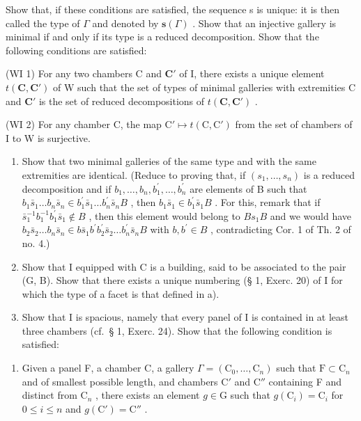 Show that, if these conditions are satisfied, the sequence s is unique: it is then called the type of \(\Gamma\) and denoted by \(\mathbf{s}(\Gamma)\) . Show that an injective gallery is minimal if and only if its type is a reduced decomposition. Show that the following conditions are satisfied:

(WI 1) For any two chambers C and \(\mathbf{C}'\) of I, there exists a unique element \(t(\mathbf{C},\mathbf{C}')\) of W such that the set of types of minimal galleries with extremities C and \(\mathbf{C}'\) is the set of reduced decompositions of \(t(\mathbf{C},\mathbf{C}')\) .

(WI 2) For any chamber C, the map \(\mathrm{C}' \mapsto t(\mathrm{C}, \mathrm{C}')\) from the set of chambers of I to W is surjective.

\begin{enumerate}
\def\labelenumi{\alph{enumi})}
\setcounter{enumi}{4}
\item
  Show that two minimal galleries of the same type and with the same extremities are identical. (Reduce to proving that, if \((s_{1},\ldots,s_{n})\) is a reduced decomposition and if \(b_{1},\ldots,b_{n},b_{1}^{\prime},\ldots,b_{n}^{\prime}\) are elements of B such that \(b_{1}\bar{s}_{1}\ldots b_{n}\bar{s}_{n}\in b_{1}^{\prime}\bar{s}_{1}\ldots b_{n}^{\prime}\bar{s}_{n}B\) , then \(b_{1}\bar{s}_{1}\in b_{1}^{\prime}\bar{s}_{1}B\) . For this, remark that if \(\bar{s}_{1}^{-1}b_{1}^{-1}b_{1}^{\prime}\bar{s}_{1}\notin B\) , then this element would belong to \(Bs_{1}B\) and we would have \(b_{2}\bar{s}_{2}\ldots b_{n}\bar{s}_{n}\in b\bar{s}_{1}b^{\prime}b_{2}^{\prime}\bar{s}_{2}\ldots b_{n}^{\prime}\bar{s}_{n}B\) with \(b,b^{\prime}\in B\) , contradicting Cor. 1 of Th. 2 of no. 4.)
\item
  Show that I equipped with C is a building, said to be associated to the pair (G, B). Show that there exists a unique numbering (§ 1, Exerc. 20) of I for which the type of a facet is that defined in a).
\item
  Show that I is spacious, namely that every panel of I is contained in at least three chambers (cf.~§ 1, Exerc. 24). Show that the following condition is satisfied:
\end{enumerate}

\begin{enumerate}
\def\labelenumi{(\Alph{enumi})}
\setcounter{enumi}{6}
\tightlist
\item
  Given a panel F, a chamber C, a gallery \(\Gamma = (\mathrm{C}_0, \ldots, \mathrm{C}_n)\) such that \(\mathrm{F} \subset \mathrm{C}_n\) and of smallest possible length, and chambers \(\mathrm{C}'\) and \(\mathrm{C}''\) containing F and distinct from \(\mathrm{C}_n\) , there exists an element \(g \in \mathrm{G}\) such that \(g(\mathrm{C}_i) = \mathrm{C}_i\) for \(0 \leqslant i \leqslant n\) and \(g(\mathrm{C}') = \mathrm{C}''\) .
\end{enumerate}

